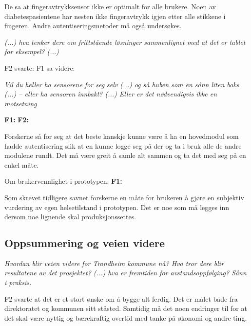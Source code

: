 De sa at fingeravtrykksensor ikke er optimalt for alle brukere. Noen av diabetespasientene har nesten ikke fingeravtrykk igjen etter alle stikkene
i fingeren. Andre autentiseringsmetoder må også undersøkes.

\textit{(...) hva tenker dere om frittstående løsninger sammenlignet med at det er tablet for eksempel? (...)}

F2 svarte: 
F1 sa videre: 

\textit{Vil du heller ha sensorene for seg selv (...) og så huben som en sånn liten boks (...)  -- eller ha sensoren innbakt? (...)  Eller er det
nødvendigvis ikke en motsetning}

\textbf{F1:}  \newline
\textbf{F2:} 

Forskerne så for seg at det beste kanskje kunne være å ha en hovedmodul som hadde autentisering slik at en kunne logge seg på der
og ta i bruk alle de andre modulene rundt. Det må være greit å samle alt sammen og ta det med seg på en enkel måte.

Om brukervennlighet i prototypen:\newline
\textbf{F1:} 

Som skrevet tidligere savnet forskerne en måte for brukeren å gjøre en subjektiv vurdering av egen helsetilstand i prototypen. Det er noe
som må legges inn dersom noe lignende skal produksjonssettes.

\subsection{Oppsummering og veien videre}
\textit{Hvordan blir veien videre for Trondheim kommune nå? Hva tror dere blir resultatene av det prosjektet? (...) hva er fremtiden for
avstandsoppfølging? Sånn i praksis.}

F2 svarte at det er et stort ønske om å bygge alt ferdig. Det er målet både fra direktoratet og kommunen sitt ståsted. Samtidig må det noen
endringer til for at det skal være nyttig og bærekraftig overtid med tanke på økonomi og andre ting.

